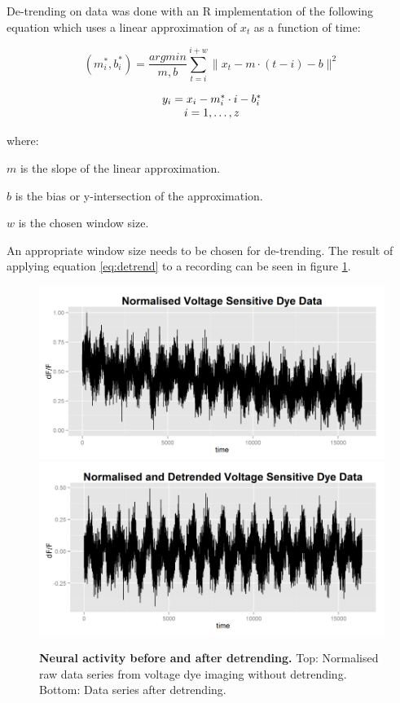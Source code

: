 De-trending on data was done with an R implementation of the following equation which uses a linear approximation of $x_{t}$ as a function of time:

\begin{equation}
\label{eq:detrend}
(m_{i}^{*},b_{i}^{*}) = \frac{argmin}{m,b}\sum_{t=i}^{i+w}\|x_{t}-m\cdot(t-i)-b\|^{2} 
\end{equation}

\begin{equation}
\begin{array}{c c }
y_{i}=x_{i}-m_{i}^{*}\cdot i - b_{i}^{*} \nonumber
\\
i=1,\ldots,z \nonumber
\end{array}
\end{equation}

where:

$m$ is the slope of the linear approximation.

$b$ is the bias or y-intersection of the approximation.

$w$ is the chosen window size.

An appropriate window size needs to be chosen for de-trending. The result of applying equation \ref{eq:detrend} to a recording can be seen in figure \ref{fig:baseline_drift}.

\begin{figure}[H]
	\begin{center}
		\includegraphics[width=\textwidth]{graphics/data_trending.png}
		\label{fig:trending}
		\includegraphics[width=\textwidth]{graphics/data_detrend.png}
		\label{fig:detrending}
		\caption[Neural activity before and after detrending.]{\textbf{Neural activity before and after detrending.} Top: Normalised raw data series from voltage dye imaging without detrending. Bottom: Data series after detrending.}
		\label{fig:baseline_drift}
	\end{center}
\end{figure}

